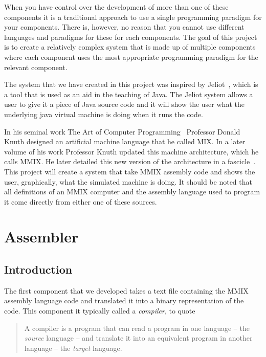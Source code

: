 \documentclass[a4paper,11pt]{report}
\begin{document}
When you have control over the development of more than one of these components it is a traditional approach to use a single programming paradigm for your components. There is, however, no reason that you cannot use different languages and paradigms for these for each components. The goal of this project is to create a relatively complex system that is made up of multiple components where each component uses the most appropriate programming paradigm for the relevant component.

The system that we have created in this project was inspired by Jeliot~\cite{jeliot:ref}, which is a tool that is used as an aid in the teaching of Java. The Jeliot system allows a user to give it a piece of Java source code and it will show the user what the underlying java virtual machine is doing when it runs the code.

In his seminal work The Art of Computer Programming~\cite{knuth:aocp1} Professor Donald Knuth designed an artificial machine language that he called MIX. In a later volume of his work Professor Knuth updated this machine architecture, which he calls MMIX. He later detailed this new version of the architecture in a fascicle~\cite{knuth:aocp2}. This project will create a system that take MMIX assembly code and shows the user, graphically, what the simulated machine is doing. It should be noted that all definitions of an MMIX computer and the assembly language used to program it come directly from either one of these sources.

\chapter{Assembler}
\label{c:assembler}
\section{Introduction}
The first component that we developed takes a text file containing the MMIX assembly language code and translated it into a binary representation of the code.  This component it typically called a \textit{compiler}, to quote \cite{dragon}

\begin{quote}
A compiler is a program that can read a program in one language -- the \textit{source} language -- and translate it into an equivalent program in another language -- the \textit{target} language.
\end{quote}
\end{document}
